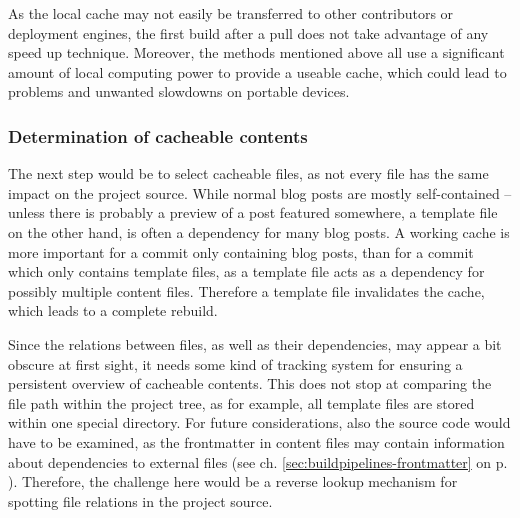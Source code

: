 As the local cache may not easily be transferred to other contributors or deployment engines, the first build after a pull does not take advantage of any speed up technique. Moreover, the methods mentioned above all use a significant amount of local computing power to provide a useable cache, which could lead to problems and unwanted slowdowns on portable devices.


\subsubsection{Determination of cacheable contents}
The next step would be to select cacheable files, as not every file has the same impact on the project source. While normal blog posts are mostly self-contained --  unless there is probably a preview of a post featured somewhere, a template file on the other hand, is often a dependency for many blog posts. A working cache is more important for a commit only containing blog posts, than for a commit which only contains template files, as a template file acts as a dependency for possibly multiple content files. Therefore a template file invalidates the cache, which leads to a complete rebuild.

Since the relations between files, as well as their dependencies, may appear a bit obscure at first sight, it needs some kind of tracking system for ensuring a persistent overview of cacheable contents. This does not stop at comparing the file path within the project tree, as for example, all template files are stored within one special directory. For future considerations, also the source code would have to be examined, as the frontmatter in content files may contain information about dependencies to external files (see ch. \ref{sec:buildpipelines-frontmatter} on p. \pageref{sec:buildpipelines-frontmatter}). Therefore, the challenge here would be a reverse lookup mechanism for spotting file relations in the project source.
